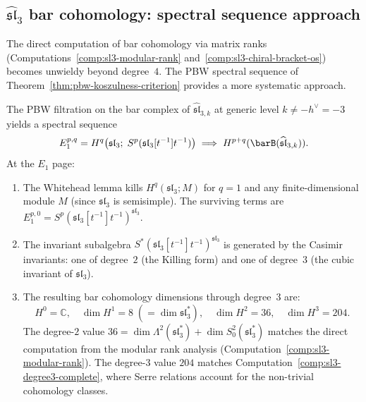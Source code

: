 \subsection{\texorpdfstring{$\widehat{\mathfrak{sl}}_3$ bar cohomology: spectral sequence approach}{sl-3 bar cohomology: spectral sequence approach}}
\label{sec:sl3-spectral-sequence}

The direct computation of bar cohomology via matrix ranks
(Computations~\ref{comp:sl3-modular-rank}
and~\ref{comp:sl3-chiral-bracket-os}) becomes unwieldy beyond degree~$4$.
The PBW spectral sequence of Theorem~\ref{thm:pbw-koszulness-criterion}
provides a more systematic approach.

\begin{proposition}
\label{prop:sl3-pbw-ss}
The PBW filtration on the bar complex of $\widehat{\mathfrak{sl}}_{3,k}$ at
generic level $k \neq -h^\vee = -3$ yields a spectral sequence
\[
E_1^{p,q} = H^q\bigl(\mathfrak{sl}_3;\; S^p(\mathfrak{sl}_3[t^{-1}]t^{-1})\bigr)
\;\Longrightarrow\; H^{p+q}(\barB(\widehat{\mathfrak{sl}}_{3,k})).
\]
At the $E_1$ page:
\begin{enumerate}[label=\textup{(\roman*)}]
\item The Whitehead lemma kills $H^q(\mathfrak{sl}_3; M)$ for $q = 1$
  and any finite-dimensional module $M$ (since $\mathfrak{sl}_3$ is semisimple).
  The surviving terms are $E_1^{p,0} = S^p(\mathfrak{sl}_3[t^{-1}]t^{-1})^{\mathfrak{sl}_3}$.
\item The invariant subalgebra
  $S^*(\mathfrak{sl}_3[t^{-1}]t^{-1})^{\mathfrak{sl}_3}$ is generated by the
  Casimir invariants: one of degree~$2$ (the Killing form) and one of degree~$3$
  (the cubic invariant of $\mathfrak{sl}_3$).
\item The resulting bar cohomology dimensions through degree~$3$ are:
  \[
  H^0 = \mathbb{C},\quad
  \dim H^1 = 8 \;(= \dim \mathfrak{sl}_3^*),\quad
  \dim H^2 = 36,\quad
  \dim H^3 = 204.
  \]
  The degree-$2$ value $36 = \dim \Lambda^2(\mathfrak{sl}_3^*) +
  \dim S^2_0(\mathfrak{sl}_3^*)$ matches the direct computation from the
  modular rank analysis (Computation~\ref{comp:sl3-modular-rank}).
  The degree-$3$ value $204$ matches
  Computation~\ref{comp:sl3-degree3-complete}, where Serre relations
  account for the non-trivial cohomology classes.
\end{enumerate}
\end{proposition}

